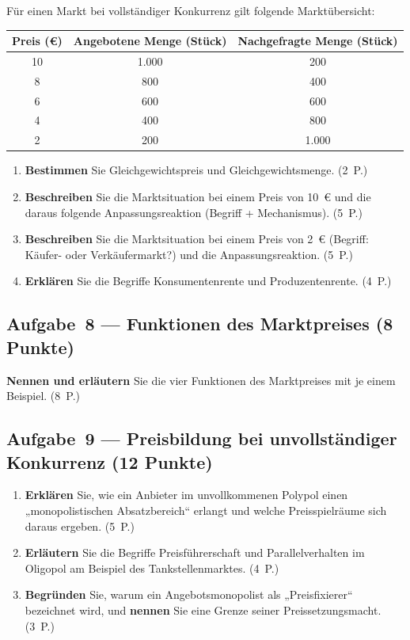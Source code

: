 \documentclass[11pt, a4paper]{article}
\begin{document}
Für einen Markt bei vollständiger Konkurrenz gilt folgende Marktübersicht:

\begin{center}
\begin{tabular}{c c c}
\toprule
\textbf{Preis (€)} & \textbf{Angebotene Menge (Stück)} & \textbf{Nachgefragte Menge (Stück)}\\
\midrule
10 & 1.000 & 200\\
8  & 800   & 400\\
6  & 600   & 600\\
4  & 400   & 800\\
2  & 200   & 1.000\\
\bottomrule
\end{tabular}
\end{center}

\begin{enumerate}[label=(\alph*)]
  \item \textbf{Bestimmen} Sie Gleichgewichtspreis und Gleichgewichtsmenge. \hfill (2~P.)
  \item \textbf{Beschreiben} Sie die Marktsituation bei einem Preis von 10~€ und die daraus folgende Anpassungsreaktion (Begriff + Mechanismus). \hfill (5~P.)
  \item \textbf{Beschreiben} Sie die Marktsituation bei einem Preis von 2~€ (Begriff: Käufer- oder Verkäufermarkt?) und die Anpassungsreaktion. \hfill (5~P.)
  \item \textbf{Erklären} Sie die Begriffe Konsumentenrente und Produzentenrente. \hfill (4~P.)
\end{enumerate}

\subsection*{Aufgabe~8 --- Funktionen des Marktpreises (8 Punkte)}

\textbf{Nennen und erläutern} Sie die vier Funktionen des Marktpreises mit je einem
Beispiel. \hfill (8~P.)

\subsection*{Aufgabe~9 --- Preisbildung bei unvollständiger Konkurrenz (12 Punkte)}

\begin{enumerate}[label=(\alph*)]
  \item \textbf{Erklären} Sie, wie ein Anbieter im unvollkommenen Polypol einen „monopolistischen Absatzbereich`` erlangt und welche Preisspielräume sich daraus ergeben. \hfill (5~P.)
  \item \textbf{Erläutern} Sie die Begriffe Preisführerschaft und Parallelverhalten im Oligopol am Beispiel des Tankstellenmarktes. \hfill (4~P.)
  \item \textbf{Begründen} Sie, warum ein Angebotsmonopolist als „Preisfixierer`` bezeichnet wird, und \textbf{nennen} Sie eine Grenze seiner Preissetzungsmacht. \hfill (3~P.)
\end{enumerate}
\end{document}
